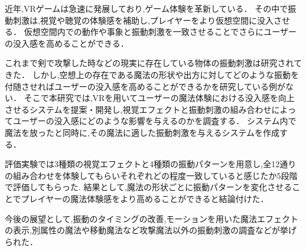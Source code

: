 近年,VRゲームは急速に発展しており,ゲーム体験を革新している．
その中で振動刺激は,視覚や聴覚の体験感を補助し,プレイヤーをより仮想空間に没入させる．
仮想空間内での動作や事象と振動刺激を一致させることでさらにユーザーの没入感を高めることができる．

これまで剣で攻撃した時などの現実に存在している物体の振動刺激は研究されてきた．
しかし,空想上の存在である魔法の形状や出方に対してどのような振動を付随させればユーザーの没入感を高めることができるかを研究している例がない．
そこで本研究では,VRを用いてユーザーの魔法体験における没入感を向上させるシステムを提案・開発し,視覚エフェクトと振動刺激の組み合わせによってユーザーの没入感にどのような影響を与えるのかを調査する．
システム内で魔法を放ったと同時に,その魔法に適した振動刺激を与えるシステムを作成する．

評価実験では3種類の視覚エフェクトと4種類の振動パターンを用意し,全12通りの組み合わせを体験してもらいそれぞれどの程度一致していると感じたか5段階で評価してもらった.
結果として,魔法の形状ごとに振動パターンを変化させることでプレイヤーの魔法体験感をより高めることができると結論付けた．

今後の展望として,振動のタイミングの改善,モーションを用いた魔法エフェクトの表示,別属性の魔法や移動魔法など攻撃魔法以外の振動刺激の調査などが挙げられた．